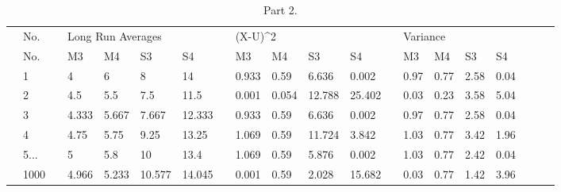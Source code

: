 \documentclass[12pt]{article}
\begin{document}
\begin{table}[h]
\centering
\label{my-label}
\begin{tabular}{l|l|l|l|l|l|l|l|l|l|l|l|l|l|l|l|l|lll}
\cline{2-17}
 & No.  &  & \multicolumn{4}{l|}{Long Run Averages} &  & \multicolumn{4}{l|}{(X-U)\textasciicircum 2} &  & \multicolumn{4}{l|}{Variance}     &  &  &  \\ \cline{2-17}
 & No.  &  & M3      & M4      & S3       & S4      &  & M3        & M4       & S3        & S4        &  & M3 & M4 & S3 & S4 &  &  &  \\ \cline{2-17}
 & 1    &  & 4       & 6       & 8        & 14      &  & 0.933     & 0.59     & 6.636     & 0.002     &  & 0.97   & 0.77   & 2.58   & 0.04   &  &  &  \\ \cline{2-17}
 & 2    &  & 4.5     & 5.5     & 7.5      & 11.5    &  & 0.001     & 0.054    & 12.788    & 25.402    &  & 0.03   & 0.23   & 3.58   & 5.04   &  &  &  \\ \cline{2-17}
 & 3    &  & 4.333   & 5.667   & 7.667    & 12.333  &  & 0.933     & 0.59     & 6.636     & 0.002     &  & 0.97   & 0.77   & 2.58   & 0.04   &  &  &  \\ \cline{2-17}
 & 4    &  & 4.75    & 5.75    & 9.25     & 13.25   &  & 1.069     & 0.59     & 11.724    & 3.842     &  & 1.03   & 0.77   & 3.42   & 1.96   &  &  &  \\ \cline{2-17}
 & 5...    &  & 5       & 5.8     & 10       & 13.4    &  & 1.069     & 0.59     & 5.876     & 0.002     &  & 1.03   & 0.77   & 2.42   & 0.04   &  &  &  \\ \cline{2-17}
 & 1000 &  & 4.966   & 5.233   & 10.577   & 14.045  &  & 0.001     & 0.59     & 2.028     & 15.682    &  & 0.03   & 0.77   & 1.42   & 3.96   &  &  &  \\ \cline{2-17}
\end{tabular}
\caption{Part 2.}
\end{table}
\end{document}
